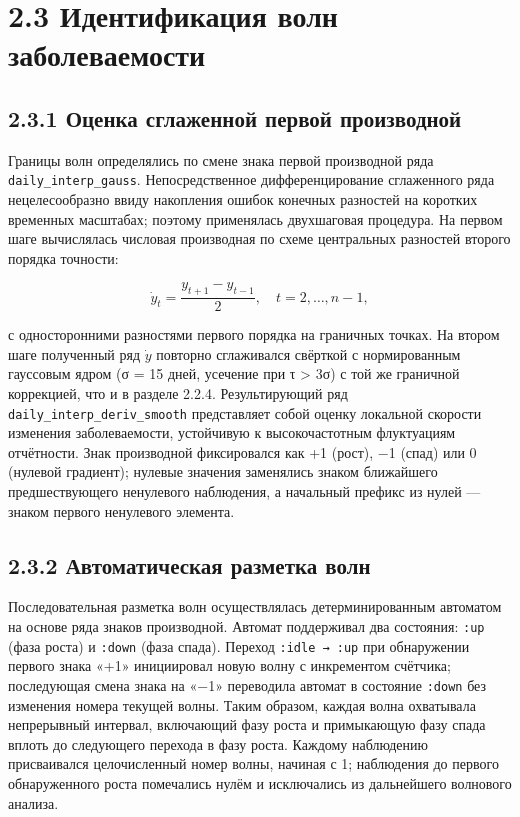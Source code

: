 \documentclass[12pt]{article}
\begin{document}
\section{2.3 Идентификация волн
заболеваемости}\label{ux438ux434ux435ux43dux442ux438ux444ux438ux43aux430ux446ux438ux44f-ux432ux43eux43bux43d-ux437ux430ux431ux43eux43bux435ux432ux430ux435ux43cux43eux441ux442ux438}

\subsection{2.3.1 Оценка сглаженной первой
производной}\label{ux43eux446ux435ux43dux43aux430-ux441ux433ux43bux430ux436ux435ux43dux43dux43eux439-ux43fux435ux440ux432ux43eux439-ux43fux440ux43eux438ux437ux432ux43eux434ux43dux43eux439}

Границы волн определялись по смене знака первой производной ряда
\texttt{daily\_interp\_gauss}. Непосредственное дифференцирование
сглаженного ряда нецелесообразно ввиду накопления ошибок конечных
разностей на коротких временных масштабах; поэтому применялась
двухшаговая процедура. На первом шаге вычислялась числовая производная
по схеме центральных разностей второго порядка точности:

\[\dot{y}_t = \frac{y_{t+1} - y_{t-1}}{2}, \quad t = 2, \ldots, n-1,\]

с односторонними разностями первого порядка на граничных точках. На
втором шаге полученный ряд \(\dot{y}\) повторно сглаживался свёрткой с
нормированным гауссовым ядром (σ = 15 дней, усечение при
\textbar τ\textbar{} \textgreater{} 3σ) с той же граничной коррекцией,
что и в разделе 2.2.4. Результирующий ряд
\texttt{daily\_interp\_deriv\_smooth} представляет собой оценку
локальной скорости изменения заболеваемости, устойчивую к
высокочастотным флуктуациям отчётности. Знак производной фиксировался
как +1 (рост), −1 (спад) или 0 (нулевой градиент); нулевые значения
заменялись знаком ближайшего предшествующего ненулевого наблюдения, а
начальный префикс из нулей --- знаком первого ненулевого элемента.

\subsection{2.3.2 Автоматическая разметка
волн}\label{ux430ux432ux442ux43eux43cux430ux442ux438ux447ux435ux441ux43aux430ux44f-ux440ux430ux437ux43cux435ux442ux43aux430-ux432ux43eux43bux43d}

Последовательная разметка волн осуществлялась детерминированным
автоматом на основе ряда знаков производной. Автомат поддерживал два
состояния: \texttt{:up} (фаза роста) и \texttt{:down} (фаза спада).
Переход \texttt{:idle\ →\ :up} при обнаружении первого знака «+1»
инициировал новую волну с инкрементом счётчика; последующая смена знака
на «−1» переводила автомат в состояние \texttt{:down} без изменения
номера текущей волны. Таким образом, каждая волна охватывала непрерывный
интервал, включающий фазу роста и примыкающую фазу спада вплоть до
следующего перехода в фазу роста. Каждому наблюдению присваивался
целочисленный номер волны, начиная с 1; наблюдения до первого
обнаруженного роста помечались нулём и исключались из дальнейшего
волнового анализа.
\end{document}
